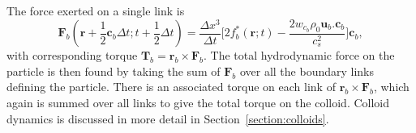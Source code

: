 The force exerted on a
single link is
\begin{equation}
\mathbf{F}_b(\mathbf{r} + {\scriptstyle\frac{1}{2}}\mathbf{c}_b\Delta t;
t + {\scriptstyle\frac{1}{2}}\Delta t) = \frac{\Delta x^3}{\Delta t}
\Big[ 2f_b^\ast(\mathbf{r}; t) - \frac{2w_{c_b}\rho_0 \mathbf{u}_b .
\mathbf{c}_b}{c_s^2} \Big] \mathbf{c}_b,
\label{eq-colloid-fb}
\end{equation}
with corresponding torque $\mathbf{T}_b = \mathbf{r}_b \times \mathbf{F}_b$.
The total hydrodynamic force on the particle is then found by taking
the sum of
$\mathbf{F}_b$ over all the boundary links defining the particle.
There is an associated torque on each link of $\mathbf{r}_b\times\mathbf{F}_b$,
which again is summed over all links to give the total torque on the colloid.
Colloid dynamics is discussed in more detail in Section~\ref{section:colloids}.




\vfill
\pagebreak
